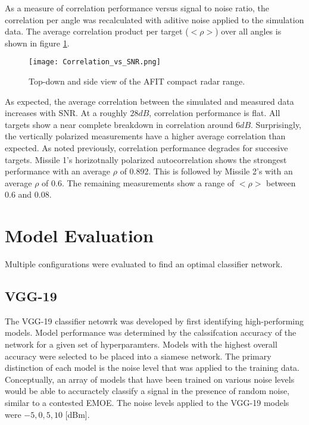 	As a measure of correlation performance versus signal to noise ratio, the correlation per angle was recalculated with aditive noise applied to the simulation data. The average correlation product per target ($<\rho>$) over all angles is shown in figure \ref{fig:correlation_results_snr}.

	\begin{figure}[htbp!]
    \centering
    \texttt{[image: Correlation\_vs\_SNR.png]}
    \caption[Average Correlation vs SNR]{Top-down and side view of the AFIT compact radar range.}
    \label{fig:correlation_results_snr}
  \end{figure}

	As expected, the average correlation between the simulated and measured data increases with SNR. At a roughly $28 dB$, correlation performance is flat. All targets show a near complete breakdown in correlation around $6 dB$. Surprisingly, the vertically polarized measurements have a higher average correlation than expected. As noted previously, correlation performance degrades for succesive targets. Missile 1's horizotnally polarized autocorrelation shows the strongest performance with an average $\rho$ of 0.892. This is followed by Missile 2's with an average $\rho$ of 0.6. The remaining measurements show a range of $<\rho>$ between 0.6 and 0.08.


\section{Model Evaluation}

	Multiple configurations were evaluated to find an optimal classifier network.

	\subsection{VGG-19}
	\label{sec:vgg-19_results}

		The VGG-19 classifier netowrk was developed by first identifying high-performing models. Model performance was determined by the calssifcation accuracy of the network for a given set of hyperparamters. Models with the highest overall accuracy were selected to be placed into a siamese network. The primary distinction of each model is the noise level that was applied to the training data. Conceptually, an array of models that have been trained on various noise levels would be able to accuractely classify a signal in the presence of random noise, similar to a contested EMOE. The noise levels applied to the VGG-19 models were $-5, 0, 5, 10$ [dBm].


